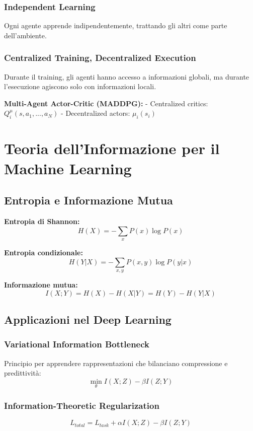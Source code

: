 \documentclass[12pt,a4paper,twoside]{report}
\begin{document}
\subsubsection{Independent Learning}
Ogni agente apprende indipendentemente, trattando gli altri come parte dell'ambiente.

\subsubsection{Centralized Training, Decentralized Execution}
Durante il training, gli agenti hanno accesso a informazioni globali, ma durante l'esecuzione agiscono solo con informazioni locali.

\textbf{Multi-Agent Actor-Critic (MADDPG):}
- Centralized critics: $Q_i^{\mu}(s, a_1, ..., a_N)$  
- Decentralized actors: $\mu_i(s_i)$

\section{Teoria dell'Informazione per il Machine Learning}

\subsection{Entropia e Informazione Mutua}

\textbf{Entropia di Shannon:}
$$H(X) = -\sum_{x} P(x) \log P(x)$$

\textbf{Entropia condizionale:}
$$H(Y|X) = -\sum_{x,y} P(x,y) \log P(y|x)$$

\textbf{Informazione mutua:}
$$I(X;Y) = H(X) - H(X|Y) = H(Y) - H(Y|X)$$

\subsection{Applicazioni nel Deep Learning}

\subsubsection{Variational Information Bottleneck}
Principio per apprendere rappresentazioni che bilanciano compressione e predittività:
$$\min_{\theta} I(X; Z) - \beta I(Z; Y)$$

\subsubsection{Information-Theoretic Regularization}
$$L_{total} = L_{task} + \alpha I(X; Z) - \beta I(Z; Y)$$
\end{document}
